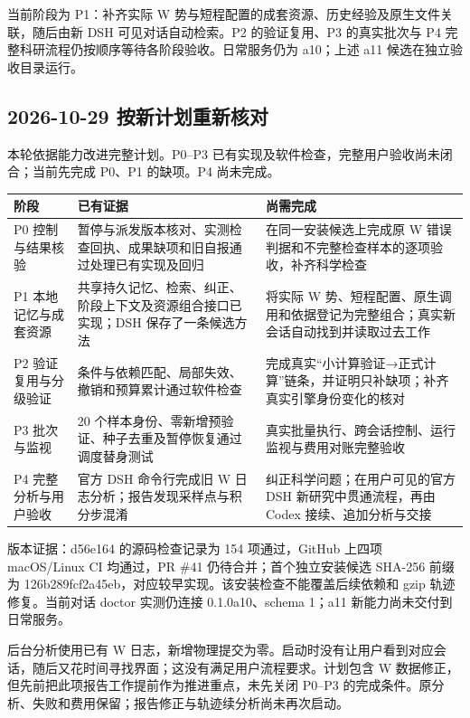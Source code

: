 \documentclass[11pt,a4paper]{ctexart}
\begin{document}
当前阶段为 P1：补齐实际 W 势与短程配置的成套资源、历史经验及原生文件关联，随后由新 DSH 可见对话自动检索。P2 的验证复用、P3 的真实批次与 P4 完整科研流程仍按顺序等待各阶段验收。日常服务仍为 a10；上述 a11 候选在独立验收目录运行。



\subsection{2026-10-29 按新计划重新核对}


本轮依据能力改进完整计划。P0–P3 已有实现及软件检查，完整用户验收尚未闭合；当前先完成 P0、P1 的缺项。P4 尚未完成。



\begin{longtable}{p{4.67cm}p{4.67cm}p{4.67cm}}
\toprule
阶段 & 已有证据 & 尚需完成 \\
\midrule\endhead
P0 控制与结果核验 & 暂停与派发版本核对、实测检查回执、成果缺项和旧自报通过处理已有实现及回归 & 在同一安装候选上完成原 W 错误判据和不完整检查样本的逐项验收，补齐科学检查 \\
P1 本地记忆与成套资源 & 共享持久记忆、检索、纠正、阶段上下文及资源组合接口已实现；DSH 保存了一条候选方法 & 将实际 W 势、短程配置、原生调用和依据登记为完整组合；真实新会话自动找到并读取过去工作 \\
P2 验证复用与分级验证 & 条件与依赖匹配、局部失效、撤销和预算累计通过软件检查 & 完成真实“小计算验证→正式计算”链条，并证明只补缺项；补齐真实引擎身份变化的核对 \\
P3 批次与监视 & 20 个样本身份、零新增预验证、种子去重及暂停恢复通过调度替身测试 & 真实批量执行、跨会话控制、运行监视与费用对账完整验收 \\
P4 完整分析与用户验收 & 官方 DSH 命令行完成旧 W 日志分析；报告发现采样点与积分步混淆 & 纠正科学问题；在用户可见的官方 DSH 新研究中贯通流程，再由 Codex 接续、追加分析与交接 \\
\bottomrule
\end{longtable}


版本证据：d56e164 的源码检查记录为 154 项通过，GitHub 上四项 macOS/\allowbreak{}Linux CI 均通过，PR \#41 仍待合并；首个独立安装候选 SHA-256 前缀为 126b289fcf2a45eb，对应较早实现。该安装检查不能覆盖后续依赖和 gzip 轨迹修复。当前对话 doctor 实测仍连接 0.1.0a10、schema 1；a11 新能力尚未交付到日常服务。



后台分析使用已有 W 日志，新增物理提交为零。启动时没有让用户看到对应会话，随后又花时间寻找界面；这没有满足用户流程要求。计划包含 W 数据修正，但先前把此项报告工作提前作为推进重点，未先关闭 P0–P3 的完成条件。原分析、失败和费用保留；报告修正与轨迹续分析尚未再次启动。
\end{document}
